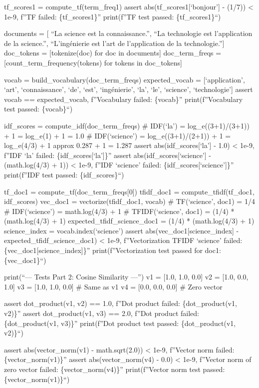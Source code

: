 \documentclass[11pt,a4paper]{report}
\begin{document}
tf\_scores1 = compute\_tf(term\_freq1) assert
abs(tf\_scores1{[}`bonjour'{]} - (1/7)) \textless{} 1e-9, f''TF failed:
\{tf\_scores1\}'' print(f''TF test passed: \{tf\_scores1\}``)

documents = {[} ``La science est la connaissance.'', ``La technologie
est l'application de la science.'', ``L'ingénierie est l'art de
l'application de la technologie.''{]} doc\_tokens = {[}tokenize(doc) for
doc in documents{]} doc\_term\_freqs = {[}count\_term\_frequency(tokens)
for tokens in doc\_tokens{]}

vocab = build\_vocabulary(doc\_term\_freqs) expected\_vocab =
{[}`application', `art', `connaissance', `de', `est', `ingénierie',
`la', `le', `science', `technologie'{]} assert vocab == expected\_vocab,
f''Vocabulary failed: \{vocab\}'' print(f''Vocabulary test passed:
\{vocab\}``)

idf\_scores = compute\_idf(doc\_term\_freqs) \# IDF(`la') =
log\_e((3+1)/(3+1)) + 1 = log\_e(1) + 1 = 1.0 \# IDF(`science') =
log\_e((3+1)/(2+1)) + 1 = log\_e(4/3) + 1 approx 0.287 + 1 = 1.287
assert abs(idf\_scores{[}`la'{]} - 1.0) \textless{} 1e-9, f''IDF `la'
failed: \{idf\_scores{[}`la'{]}\}'' assert
abs(idf\_scores{[}`science'{]} - (math.log(4/3) + 1)) \textless{} 1e-9,
f''IDF `science' failed: \{idf\_scores{[}`science'{]}\}'' print(f''IDF
test passed: \{idf\_scores\}``)

tf\_doc1 = compute\_tf(doc\_term\_freqs{[}0{]}) tfidf\_doc1 =
compute\_tfidf(tf\_doc1, idf\_scores) vec\_doc1 = vectorize(tfidf\_doc1,
vocab) \# TF(`science', doc1) = 1/4 \# IDF(`science') = math.log(4/3) +
1 \# TFIDF(`science', doc1) = (1/4) * (math.log(4/3) + 1)
expected\_tfidf\_science\_doc1 = (1/4) * (math.log(4/3) + 1)
science\_index = vocab.index(`science') assert
abs(vec\_doc1{[}science\_index{]} - expected\_tfidf\_science\_doc1)
\textless{} 1e-9, f''Vectorization TFIDF `science' failed:
\{vec\_doc1{[}science\_index{]}\}'' print(f''Vectorization test passed
for doc1: \{vec\_doc1\}``)

print(``\n--- Tests Part 2: Cosine Similarity ---'') v1 = {[}1.0, 1.0,
0.0{]} v2 = {[}1.0, 0.0, 1.0{]} v3 = {[}1.0, 1.0, 0.0{]} \# Same as v1
v4 = {[}0.0, 0.0, 0.0{]} \# Zero vector

assert dot\_product(v1, v2) == 1.0, f''Dot product failed:
\{dot\_product(v1, v2)\}'' assert dot\_product(v1, v3) == 2.0, f''Dot
product failed: \{dot\_product(v1, v3)\}'' print(f''Dot product test
passed: \{dot\_product(v1, v2)\}``)

assert abs(vector\_norm(v1) - math.sqrt(2.0)) \textless{} 1e-9,
f''Vector norm failed: \{vector\_norm(v1)\}'' assert
abs(vector\_norm(v4) - 0.0) \textless{} 1e-9, f''Vector norm of zero
vector failed: \{vector\_norm(v4)\}'' print(f''Vector norm test passed:
\{vector\_norm(v1)\}``)
\end{document}
